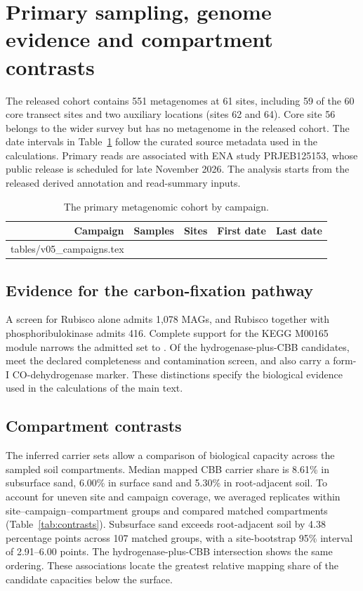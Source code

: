 \documentclass[11pt,a4paper]{article}
\makeatletter
\newcommand{\CampaignRows}{\@@input tables/v05_campaigns.tex }
\makeatother
\begin{document}
\section{Primary sampling, genome evidence and compartment contrasts}
The released cohort contains 551 metagenomes at 61 sites, including 59 of the 60 core transect sites and two auxiliary locations (sites 62 and 64). Core site 56 belongs to the wider survey but has no metagenome in the released cohort. The date intervals in Table~\ref{tab:campaigns} follow the curated source metadata used in the calculations. Primary reads are associated with ENA study PRJEB125153, whose public release is scheduled for late November 2026. The analysis starts from the released derived annotation and read-summary inputs.
\begin{table}[ht]\centering\small
\caption{The primary metagenomic cohort by campaign.}\label{tab:campaigns}\begin{tabular}{rrrrr}\toprule
Campaign & Samples & Sites & First date & Last date\\\midrule
\CampaignRows
\bottomrule\end{tabular}\end{table}

\subsection{Evidence for the carbon-fixation pathway}
A screen for Rubisco alone admits 1,078 MAGs, and Rubisco together with phosphoribulokinase admits 416. Complete support for the KEGG M00165 module narrows the admitted set to \CBBFull{}. Of the \HtwoCBB{} hydrogenase-plus-CBB candidates, \HtwoCBBStrict{} meet the declared completeness and contamination screen, and \DualHtwoCO{} also carry a form-I CO-dehydrogenase marker. These distinctions specify the biological evidence used in the calculations of the main text.

\subsection{Compartment contrasts}
The inferred carrier sets allow a comparison of biological capacity across the sampled soil compartments. Median mapped CBB carrier share is 8.61\% in subsurface sand, 6.00\% in surface sand and 5.30\% in root-adjacent soil. To account for uneven site and campaign coverage, we averaged replicates within site--campaign--compartment groups and compared matched compartments (Table~\ref{tab:contrasts}). Subsurface sand exceeds root-adjacent soil by 4.38 percentage points across 107 matched groups, with a site-bootstrap 95\% interval of 2.91--6.00 points. The hydrogenase-plus-CBB intersection shows the same ordering. These associations locate the greatest relative mapping share of the candidate capacities below the surface.
\end{document}
